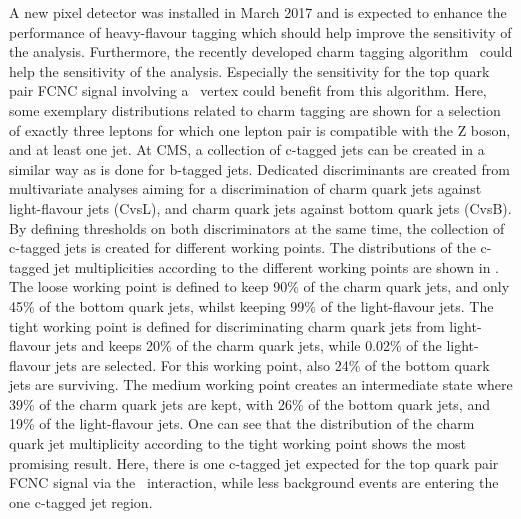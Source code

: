 A new pixel detector was installed in March 2017 and is expected to enhance the performance of heavy-flavour tagging which should help improve the sensitivity of the analysis. Furthermore, the recently developed charm tagging algorithm~\cite{CMS-PAS-BTV-16-001} could help the sensitivity of the analysis.  Especially  the sensitivity for the top quark pair FCNC signal involving a \Zct\ vertex could benefit from this algorithm. Here, some exemplary distributions related to charm tagging are shown for a selection of exactly three leptons for which one lepton pair is compatible with the Z boson, and at least one jet. At CMS, a collection of c-tagged jets can be created in a similar way as is done for b-tagged jets. Dedicated discriminants are created from multivariate analyses aiming for a discrimination of charm quark jets against light-flavour jets (CvsL),  and charm quark jets against bottom quark jets (CvsB). By defining thresholds on both discriminators at the same time, the collection of c-tagged jets is created for different working points. The distributions of the c-tagged jet multiplicities according to the different working points are shown in . The loose working point is defined to keep 90\% of the charm quark jets, and only 45\% of the bottom quark jets, whilst keeping 99\% of the light-flavour jets. The tight working point is defined for discriminating charm quark jets from light-flavour jets and keeps 20\% of the charm quark jets, while 0.02\% of the light-flavour jets are selected. For this working point, also 24\% of the bottom quark jets are surviving. The medium working point creates an intermediate state where 39\% of the charm quark jets are kept, with 26\% of the bottom quark jets, and 19\% of the light-flavour jets. One can see that the distribution of the charm quark jet multiplicity according to the tight working point shows the most promising result. Here, there is one c-tagged jet expected for the top quark pair FCNC signal via the \Zct\ interaction, while less background events are entering the one c-tagged jet region.


